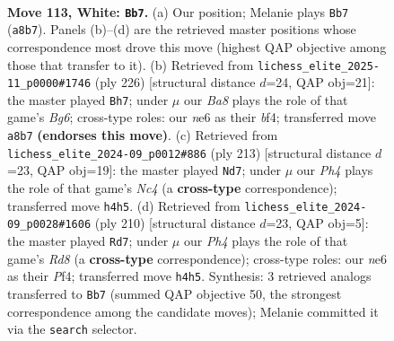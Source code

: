 \documentclass[11pt]{article}
\begin{document}
\clearpage

\begin{figure}[p]\centering
\begin{subfigure}{0.46\textwidth}\centering
\resizebox{\linewidth}{!}{%
\newchessgame
\chessboard[
  setfen={B7/2P3k1/4n3/6P1/6KP/8/8/8 w - - 1 113},
  showmover=false,
  pgfstyle=straightmove, color=movearrow, markmove={a8-b7}
]}
\caption{}
\end{subfigure}\hfill
\begin{subfigure}{0.46\textwidth}\centering
\resizebox{\linewidth}{!}{%
\newchessgame
\chessboard[
  setfen={1k6/1p6/3P2B1/2PK4/5b2/8/8/8 w - - 27 114},
  showmover=false,
  pgfstyle=straightmove, color=movearrow, markmove={g6-h7}
]}
\caption{}
\end{subfigure}
\\[4pt]
\begin{subfigure}{0.46\textwidth}\centering
\resizebox{\linewidth}{!}{%
\newchessgame
\chessboard[
  setfen={8/4N3/1kp5/p1n5/8/K7/8/8 b - - 21 107},
  showmover=false,
  pgfstyle=straightmove, color=movearrow, markmove={c5-d7}
]}
\caption{}
\end{subfigure}\hfill
\begin{subfigure}{0.46\textwidth}\centering
\resizebox{\linewidth}{!}{%
\newchessgame
\chessboard[
  setfen={3R4/8/6Pk/5K1P/5P2/8/8/8 w - - 1 106},
  showmover=false,
  pgfstyle=straightmove, color=movearrow, markmove={d8-d7}
]}
\caption{}
\end{subfigure}
\caption{\textbf{Move 113, White: \texttt{Bb7}.} (a) Our position; Melanie plays \texttt{Bb7} (\texttt{a8b7}). Panels (b)--(d) are the retrieved master positions whose correspondence most drove this move (highest QAP objective among those that transfer to it). (b) Retrieved from \texttt{lichess\_elite\_2025-11\_p0000\#1746} (ply 226) [structural distance $d$=24, QAP obj=21]: the master played \texttt{Bh7}; under $\mu$ our \emph{Ba8} plays the role of that game's \emph{Bg6}; cross-type roles: our \emph{n}e6 as their \emph{b}f4; transferred move \texttt{a8b7} \textbf{(endorses this move)}. (c) Retrieved from \texttt{lichess\_elite\_2024-09\_p0012\#886} (ply 213) [structural distance $d$=23, QAP obj=19]: the master played \texttt{Nd7}; under $\mu$ our \emph{Ph4} plays the role of that game's \emph{Nc4} (a \textbf{cross-type} correspondence); transferred move \texttt{h4h5}. (d) Retrieved from \texttt{lichess\_elite\_2024-09\_p0028\#1606} (ply 210) [structural distance $d$=23, QAP obj=5]: the master played \texttt{Rd7}; under $\mu$ our \emph{Ph4} plays the role of that game's \emph{Rd8} (a \textbf{cross-type} correspondence); cross-type roles: our \emph{n}e6 as their \emph{P}f4; transferred move \texttt{h4h5}. Synthesis: 3 retrieved analogs transferred to \texttt{Bb7} (summed QAP objective 50, the strongest correspondence among the candidate moves); Melanie committed it via the \texttt{search} selector.}
\label{fig:thought-m224}
\end{figure}
\end{document}
